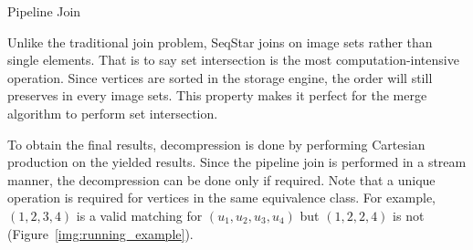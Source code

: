 \begin{algorithm}[ht]
  \caption{Pipeline Join}\label{alg:join}
\end{algorithm}

Unlike the traditional join problem, SeqStar joins on image sets rather than single elements.
That is to say set intersection is the most computation-intensive operation.
Since vertices are sorted in the storage engine,
the order will still preserves in every image sets.
This property makes it perfect for the merge algorithm to perform set intersection.

To obtain the final results, decompression is done by performing Cartesian production on the yielded results.
Since the pipeline join is performed in a stream manner, the decompression can be done only if required.
Note that a unique operation is required for vertices in the same equivalence class.
For example, $(1, 2, 3, 4)$ is a valid matching for $(u_1, u_2, u_3, u_4)$ but $(1, 2, 2, 4)$ is not (Figure~\ref{img:running_example}).


